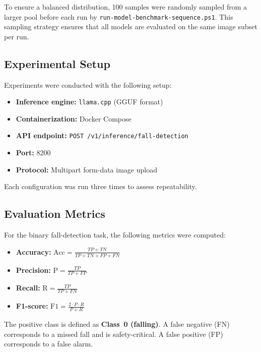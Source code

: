 \documentclass[12pt, a4paper]{article}
\begin{document}
To ensure a balanced distribution, 100 samples were randomly sampled
from a larger pool before each run by \texttt{run-model-benchmark-sequence.ps1}.
This sampling strategy ensures that all models are evaluated on the same image
subset per run.

\subsection{Experimental Setup}

Experiments were conducted with the following setup:
\begin{itemize}
    \item \textbf{Inference engine:} \texttt{llama.cpp} (GGUF format)
    \item \textbf{Containerization:} Docker Compose
    \item \textbf{API endpoint:} \texttt{POST /v1/inference/fall-detection}
    \item \textbf{Port:} 8200
    \item \textbf{Protocol:} Multipart form-data image upload
\end{itemize}

Each configuration was run three times to assess repeatability.

\subsection{Evaluation Metrics}

For the binary fall-detection task, the following metrics were computed:

\begin{itemize}
    \item \textbf{Accuracy:} $\text{Acc} = \frac{TP + TN}{TP + TN + FP + FN}$
    \item \textbf{Precision:} $\text{P} = \frac{TP}{TP + FP}$
    \item \textbf{Recall:} $\text{R} = \frac{TP}{TP + FN}$
    \item \textbf{F1-score:} $\text{F1} = \frac{2 \cdot P \cdot R}{P + R}$
\end{itemize}

The positive class is defined as \textbf{Class~0 (falling)}. A false negative
(FN) corresponds to a missed fall and is safety-critical. A false positive (FP)
corresponds to a false alarm.

\end{document}
